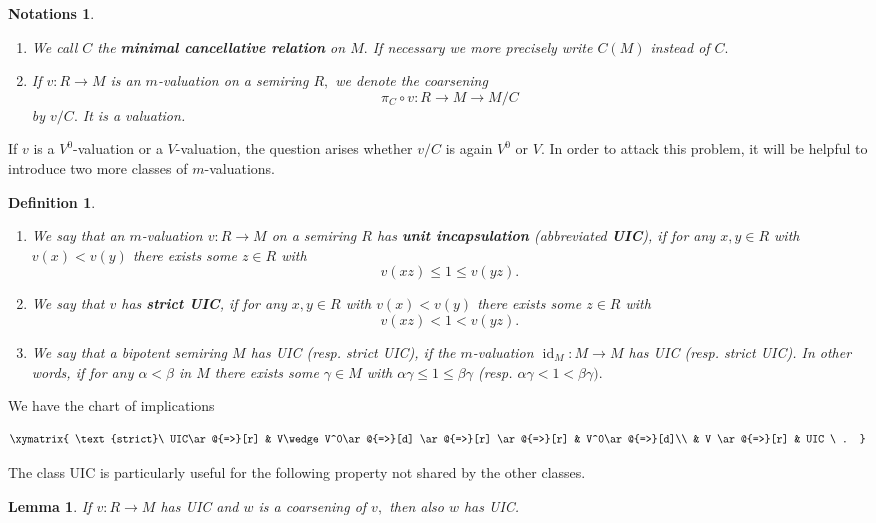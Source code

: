 \documentclass [12pt,a4paper,reqno]{amsart}
\newtheorem{lemma}[thm]{Lemma}
\newtheorem{defn}[thm]{Definition}
\newtheorem{notations}[thm]{Notations}
\begin{document}
\begin{notations} $ $
\begin{enumerate}{{}}
    \item  We call $C$ the {\textbf{{minimal cancellative
relation}}} on $M.$ If necessary we more precisely write $C(M)$
instead of $C.$
    \item  If $v: R\to M$ is an $m$-valuation on a semiring $R,$ we
denote the coarsening
$$\pi_C\circ v: R\to M\to M/C$$
by $v/C.$ It is a valuation.
\end{enumerate}
\end{notations}

If $v$ is a $V^0$-valuation or a $V$-valuation, the question
arises whether $v/C$ is again $V^0$ or $V.$ In order to attack
this problem, it will be helpful to introduce two more classes of
$m$-valuations.

\begin{defn}\label{def2.3}  $ $
\begin{enumerate}{{}}
\item We say that an $m$-valuation $v: R\to M$ on a semiring $R$
has {\textbf{{unit incapsulation}}} (abbreviated {\textbf{{UIC}}}), if for any
$x,y\in R$ with $v(x)<v(y)$ there exists some $z\in R$ with
$$v(xz)\le 1\le v(yz).$$

\item We say that $v$ has {\textbf{{strict UIC}}}, if for any $x,y\in R$
with $v(x)<v(y)$ there exists some $z\in R$ with
$$v(xz)<1<v(yz).$$

\item  We say that a bipotent semiring $M$ has UIC (resp. strict
UIC), if the $m$-valuation ${\operatorname{id}}_M: M\to M$ has UIC (resp. strict
UIC). In other words, if for any ${\alpha} <{\beta} $ in $M$ there exists
some ${\gamma} \in M$ with ${\alpha} {\gamma} \le 1\le {\beta} {\gamma} $ (resp. ${\alpha} {\gamma}
<1<{\beta} {\gamma} ).$

\end{enumerate}
\end{defn}

We have the chart of implications

$$\xymatrix{
\text{strict}\ UIC\ar @{=>}[r] & V\wedge V^0\ar@{=>}[d] \ar
@{=>}[r] \ar
 @{=>}[r] & V^0\ar@{=>}[d]\\ & V
  \ar @{=>}[r]  & UIC \ .
 }$$

The class UIC is particularly useful for the following property
not shared by the other classes.

\begin{lemma}\label{lem2.4}
If $v: R\to M$ has UIC and $w$ is a coarsening of $v,$ then also
$w$ has UIC.\end{lemma}
\end{document}
